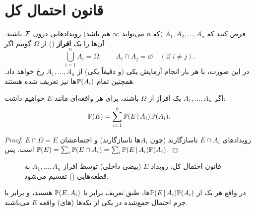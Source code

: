 \section{قانون احتمال کل }

\begin{definition}[افراز]
فرض کنید که $A_1,A_2,\ldots,A_n$ (که $n$ می‌تواند $\infty$ هم باشد) رویدادهایی درون $\mathcal{F}$ باشند. آن‌ها را یک \textbf{افراز} () از $\Omega$ گوییم اگر
\[
\bigcup_{i=1}^{n}A_i=\Omega,\qquad A_i\cap A_j=\varnothing\quad(\text{if } i\neq j).
\]
در این صورت، با هر بار انجام آزمایش یکی (و دقیقاً یکی) از $A_1,\ldots,A_n$ رخ خواهد داد. همچنین تمام $\mathbb{P}(A_i)$ها نیز تعریف شده هستند.
\end{definition}

\begin{theorem}
اگر $A_1,\ldots,A_n$ یک افراز از $\Omega$ باشند، برای هر واقعه‌ای مانند $E$ خواهیم داشت:
\[
\mathbb{P}(E)=\sum_{i=1}^{n}\mathbb{P}(E\,|\, A_i)\,\mathbb{P}(A_i).
\]
\end{theorem}
\begin{proof}
رویدادهای $E\cap A_i$ ناسازگارند (چون $A_i$ها ناسازگارند) و اجتماعشان $E\cap\Omega=E$ است. پس
$\mathbb{P}(E)=\sum_i\mathbb{P}(E\cap A_i)=\sum_i\mathbb{P}(E\,|\, A_i)\mathbb{P}(A_i)$.
\end{proof}

\begin{figure}[H]
\centering
{}
\caption{قانون احتمال کل: رویداد $E$ (بیضی داخلی) توسط افراز $A_1,\ldots,A_n$ به قطعه‌هایی () تقسیم می‌شود.}
\end{figure}

در واقع هر یک از $\mathbb{P}(E\,|\, A_i)\mathbb{P}(A_i)$ها، طبق تعریف برابر با $\mathbb{P}(E,A_i)$ هستند، و برابر با جرم احتمال جمع‌شده در یکی از تکه‌ها (های) واقعه $E$ می‌باشند.

